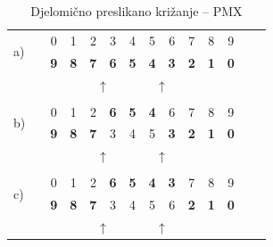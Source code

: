 \documentclass[times, utf8, zavrsni]{fer}
\begin{document}
\begin{table}[!htbp]
\centering
\caption{Djelomično preslikano križanje -- PMX}
\label{pmx}
\begin{tabular}{llccccccccccll}
\cline{3-12}
\multirow{2}{*}{a)} & \multicolumn{1}{l|}{} & \multicolumn{1}{c|}{0} & \multicolumn{1}{c|}{1} & \multicolumn{1}{c|}{2} & \multicolumn{1}{c|}{3} & \multicolumn{1}{c|}{4} & \multicolumn{1}{c|}{5} & \multicolumn{1}{c|}{6} & \multicolumn{1}{c|}{7} & \multicolumn{1}{c|}{8} & \multicolumn{1}{c|}{9} &  &  \\ \cline{3-12}
 & \multicolumn{1}{l|}{} & \multicolumn{1}{c|}{\textbf{9}} & \multicolumn{1}{c|}{\textbf{8}} & \multicolumn{1}{c|}{\textbf{7}} & \multicolumn{1}{c|}{\textbf{6}} & \multicolumn{1}{c|}{\textbf{5}} & \multicolumn{1}{c|}{\textbf{4}} & \multicolumn{1}{c|}{\textbf{3}} & \multicolumn{1}{c|}{\textbf{2}} & \multicolumn{1}{c|}{\textbf{1}} & \multicolumn{1}{c|}{\textbf{0}} &  &  \\ \cline{3-12}
 &  &  &  & \multicolumn{2}{c}{$\uparrow$} &  & \multicolumn{2}{c}{$\uparrow$} &  &  &  &  &  \\
 &  &  &  &  &  &  &  &  &  &  &  &  &  \\ \cline{3-12}
\multirow{2}{*}{b)} & \multicolumn{1}{l|}{} & \multicolumn{1}{c|}{0} & \multicolumn{1}{c|}{1} & \multicolumn{1}{c|}{2} & \multicolumn{1}{c|}{\textbf{6}} & \multicolumn{1}{c|}{\textbf{5}} & \multicolumn{1}{c|}{\textbf{4}} & \multicolumn{1}{c|}{6} & \multicolumn{1}{c|}{7} & \multicolumn{1}{c|}{8} & \multicolumn{1}{c|}{9} &  &  \\ \cline{3-12}
 & \multicolumn{1}{l|}{} & \multicolumn{1}{c|}{\textbf{9}} & \multicolumn{1}{c|}{\textbf{8}} & \multicolumn{1}{c|}{\textbf{7}} & \multicolumn{1}{c|}{3} & \multicolumn{1}{c|}{4} & \multicolumn{1}{c|}{5} & \multicolumn{1}{c|}{\textbf{3}} & \multicolumn{1}{c|}{\textbf{2}} & \multicolumn{1}{c|}{\textbf{1}} & \multicolumn{1}{c|}{\textbf{0}} &  &  \\ \cline{3-12}
 &  &  &  & \multicolumn{2}{c}{$\uparrow$} &  & \multicolumn{2}{c}{$\uparrow$} &  &  &  &  &  \\
 &  &  &  &  &  &  &  &  &  &  &  &  &  \\ \cline{3-12}
\multirow{2}{*}{c)} & \multicolumn{1}{l|}{} & \multicolumn{1}{c|}{0} & \multicolumn{1}{c|}{1} & \multicolumn{1}{c|}{2} & \multicolumn{1}{c|}{\textbf{6}} & \multicolumn{1}{c|}{\textbf{5}} & \multicolumn{1}{c|}{\textbf{4}} & \multicolumn{1}{c|}{\textbf{3}} & \multicolumn{1}{c|}{7} & \multicolumn{1}{c|}{8} & \multicolumn{1}{c|}{9} &  &  \\ \cline{3-12}
 & \multicolumn{1}{l|}{} & \multicolumn{1}{c|}{\textbf{9}} & \multicolumn{1}{c|}{\textbf{8}} & \multicolumn{1}{c|}{\textbf{7}} & \multicolumn{1}{c|}{3} & \multicolumn{1}{c|}{4} & \multicolumn{1}{c|}{5} & \multicolumn{1}{c|}{6} & \multicolumn{1}{c|}{\textbf{2}} & \multicolumn{1}{c|}{\textbf{1}} & \multicolumn{1}{c|}{\textbf{0}} &  &  \\ \cline{3-12}
 &  &  &  & \multicolumn{2}{c}{$\uparrow$} &  & \multicolumn{2}{c}{$\uparrow$} &  &  &  &  & 
\end{tabular}
\end{table}
\end{document}
